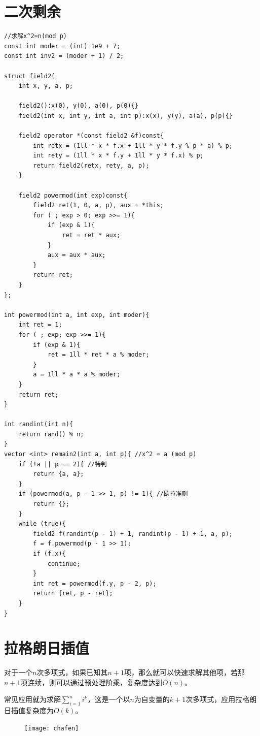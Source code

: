 \documentclass[a4paper,11pt,twoside,fontset = fandol,UTF8]{ctexbook} %
\begin{document}
	\section{二次剩余}
	\begin{lstlisting}
//求解x^2=n(mod p)
const int moder = (int) 1e9 + 7;
const int inv2 = (moder + 1) / 2;
 
struct field2{
    int x, y, a, p;
 
    field2():x(0), y(0), a(0), p(0){}
    field2(int x, int y, int a, int p):x(x), y(y), a(a), p(p){}
 
    field2 operator *(const field2 &f)const{
        int retx = (1ll * x * f.x + 1ll * y * f.y % p * a) % p;
        int rety = (1ll * x * f.y + 1ll * y * f.x) % p;
        return field2(retx, rety, a, p);
    }
 
    field2 powermod(int exp)const{
        field2 ret(1, 0, a, p), aux = *this;
        for ( ; exp > 0; exp >>= 1){
            if (exp & 1){
                ret = ret * aux;
            }
            aux = aux * aux;
        }
        return ret;
    }
};
 
int powermod(int a, int exp, int moder){
    int ret = 1;
    for ( ; exp; exp >>= 1){
        if (exp & 1){
            ret = 1ll * ret * a % moder;
        }
        a = 1ll * a * a % moder;
    }
    return ret;
}
 
int randint(int n){
    return rand() % n;
}
vector <int> remain2(int a, int p){ //x^2 = a (mod p)
    if (!a || p == 2){ //特判 
        return {a, a};
    }
    if (powermod(a, p - 1 >> 1, p) != 1){ //欧拉准则 
        return {};
    }
    while (true){
        field2 f(randint(p - 1) + 1, randint(p - 1) + 1, a, p);
        f = f.powermod(p - 1 >> 1);
        if (f.x){
            continue;
        }
        int ret = powermod(f.y, p - 2, p);
        return {ret, p - ret};
    }
} 
	\end{lstlisting}
	\section{拉格朗日插值}
	对于一个$n$次多项式，如果已知其$n+1$项，那么就可以快速求解其他项，若那$n+1$项连续，则可以通过预处理阶乘，复杂度达到$O(n)$。
	
	常见应用就为求解$\sum_{i=1}^{n}i^k$，这是一个以$n$为自变量的$k+1$次多项式，应用拉格朗日插值复杂度为$O(k)$。

	\begin{figure}[!htb]
		\centering
		\texttt{[image: chafen]}    %
	\end{figure}
\end{document}
